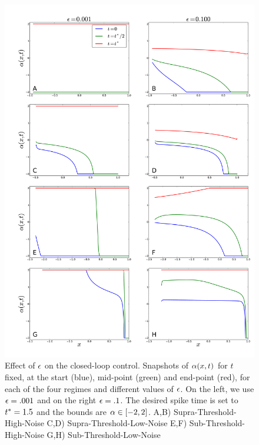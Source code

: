 \documentclass{article}
\begin{document}
\begin{figure}[htp]
\begin{center}
  \includegraphics[width=.99\textwidth]{Figs/HJB/Regimes_eps_comparison.pdf}
  \caption[labelInTOC]{Effect of ${\epsilon}$ on the closed-loop control. Snapshots of
  ${\alpha}(x,t)$ for $t$ fixed, at the start (blue), mid-point (green) and end-point
  (red), for each of the four regimes and different values of ${\epsilon}$.
  On the left, we use ${\epsilon} = .001$ and on the right ${\epsilon} = .1$. 
  The desired spike time is set to
  ${ t^* }=1.5$ and the bounds are ${\alpha} \in [-2,2]$.
  A,B) Supra-Threshold-High-Noise C,D) Supra-Threshold-Low-Noise 
  E,F) Sub-Threshold-High-Noise G,H) Sub-Threshold-Low-Noise}
\label{fig:HJB_4regimes_control_different_eps} 
\end{center}
\end{figure}
\end{document}
